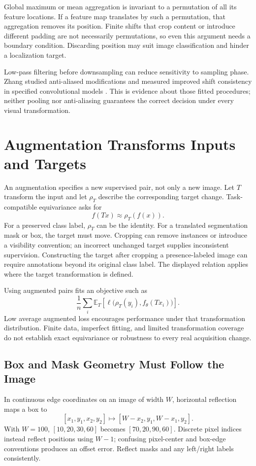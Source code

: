 Global maximum or mean aggregation is invariant to a permutation of all its feature locations. If a feature map translates by such a permutation, that aggregation removes its position. Finite shifts that crop content or introduce different padding are not necessarily permutations, so even this argument needs a boundary condition. Discarding position may suit image classification and hinder a localization target.

Low-pass filtering before downsampling can reduce sensitivity to sampling phase. Zhang studied anti-aliased modifications and measured improved shift consistency in specified convolutional models \citep{zhang2019shift}. This is evidence about those fitted procedures; neither pooling nor anti-aliasing guarantees the correct decision under every visual transformation.

\section{Augmentation Transforms Inputs and Targets}

An augmentation specifies a new supervised pair, not only a new image. Let $T$ transform the input and let $\rho_T$ describe the corresponding target change. Task-compatible equivariance asks for
\[
f(Tx)\approx\rho_T(f(x)).
\]
For a preserved class label, $\rho_T$ can be the identity. For a translated segmentation mask or box, the target must move. Cropping can remove instances or introduce a visibility convention; an incorrect unchanged target supplies inconsistent supervision. Constructing the target after cropping a presence-labeled image can require annotations beyond its original class label. The displayed relation applies where the target transformation is defined.

Using augmented pairs fits an objective such as
\[
\frac1n\sum_i\mathbb E_T\left[\ell\bigl(\rho_T(y_i),f_\theta(Tx_i)\bigr)\right].
\]
Low average augmented loss encourages performance under that transformation distribution. Finite data, imperfect fitting, and limited transformation coverage do not establish exact equivariance or robustness to every real acquisition change.

\subsection{Box and Mask Geometry Must Follow the Image}

In continuous edge coordinates on an image of width $W$, horizontal reflection maps a box to
\[
[x_1,y_1,x_2,y_2]\mapsto[W-x_2,y_1,W-x_1,y_2].
\]
With $W=100$, $[10,20,30,60]$ becomes $[70,20,90,60]$. Discrete pixel indices instead reflect positions using $W-1$; confusing pixel-center and box-edge conventions produces an offset error. Reflect masks and any left/right labels consistently.

